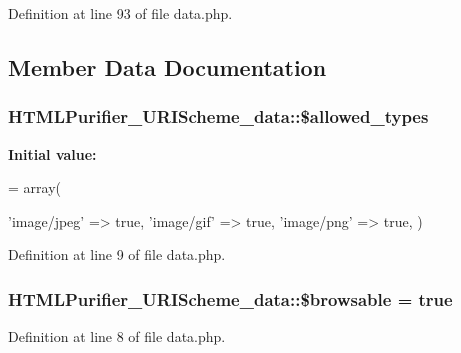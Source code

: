 Definition at line 93 of file data.\+php.



\subsection{Member Data Documentation}
\hypertarget{classHTMLPurifier__URIScheme__data_a2be7445398e03794937d6f8ab28e305d}{
\subsubsection[{\$allowed\+\_\+types}]{\setlength{\rightskip}{0pt plus 5cm}H\+T\+M\+L\+Purifier\+\_\+\+U\+R\+I\+Scheme\+\_\+data\+::\$allowed\+\_\+types}}\label{classHTMLPurifier__URIScheme__data_a2be7445398e03794937d6f8ab28e305d}
{\bfseries Initial value\+:}
\begin{DoxyCode}
= array(
        
        
        \textcolor{stringliteral}{'image/jpeg'} => \textcolor{keyword}{true},
        \textcolor{stringliteral}{'image/gif'} => \textcolor{keyword}{true},
        \textcolor{stringliteral}{'image/png'} => \textcolor{keyword}{true},
        )
\end{DoxyCode}


Definition at line 9 of file data.\+php.

\hypertarget{classHTMLPurifier__URIScheme__data_a2d60b4a273c9f16a1a9edc48b3f12fe8}{
\subsubsection[{\$browsable}]{\setlength{\rightskip}{0pt plus 5cm}H\+T\+M\+L\+Purifier\+\_\+\+U\+R\+I\+Scheme\+\_\+data\+::\$browsable = true}}\label{classHTMLPurifier__URIScheme__data_a2d60b4a273c9f16a1a9edc48b3f12fe8}


Definition at line 8 of file data.\+php.

